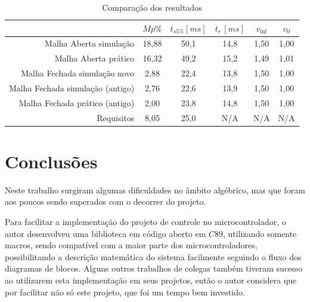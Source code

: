 \documentclass[
	12pt,				%
	article,			%
	openright,			%
	oneside,
	a4paper,			%
	chapter=TITLE,		%
	section=TITLE,		%
	english,			%
	french,				%
	spanish,			%
	brazil,				%
]{abntex2}
\begin{document}
                \begin{table}[htbp]
                    \label{tab-resultados}
                    \centering
                    \caption{Comparação dos resultados}
                    \begin{tabular}{r|c|c|c|c|c}
                                    &                       $Mp\%$&     $t_{s5\%}[ms]$&     $t_r\,[ms]$ &       $v_{\inf}$ &	$v_{0}$ \\ \hline
                        Malha Aberta simulação  &           18,88 &     50,1 &              14,8 &              1,50 & 			1,00 \\
                        Malha Aberta prático  &             16,32 &     49,2 &              15,2 &              1,49 & 			1,01 \\
                        Malha Fechada simulação novo &      2,88 &      22,4 &              13,8 &              1,50 & 			1,00 \\
                        Malha Fechada simulação (antigo) &  2,76 &      22,6 &              13,9 &              1,50 & 			1,00 \\
                        Malha Fechada prático (antigo) &    2,00 &      23,8 &              14,8 &              1,50 &			1,00 \\
                        Requisitos	        &		        8,05 &	    25,0 &				N/A	&				N/A	&			N/A
                    \end{tabular}
                \end{table}

    \section{Conclusões}
    
        Neste trabalho surgiram algumas dificuldades no âmbito algébrico, mas que foram aos poucos sendo superados com o decorrer do projeto.
        
        Para facilitar a implementação do projeto de controle no microcontrolador, o autor desenvolveu uma biblioteca em código aberto em $C 89$, utilizando somente macros, sendo compatível com a maior parte dos microcontroladores, possibilitando a descrição matemática do sistema facilmente seguindo o fluxo dos diagramas de blocos. Alguns outros trabalhos de colegas também tiveram sucesso ao utilizarem esta implementação em seus projetos, então o autor considera que por facilitar não só este projeto, que foi um tempo bem investido.
        
\end{document}
